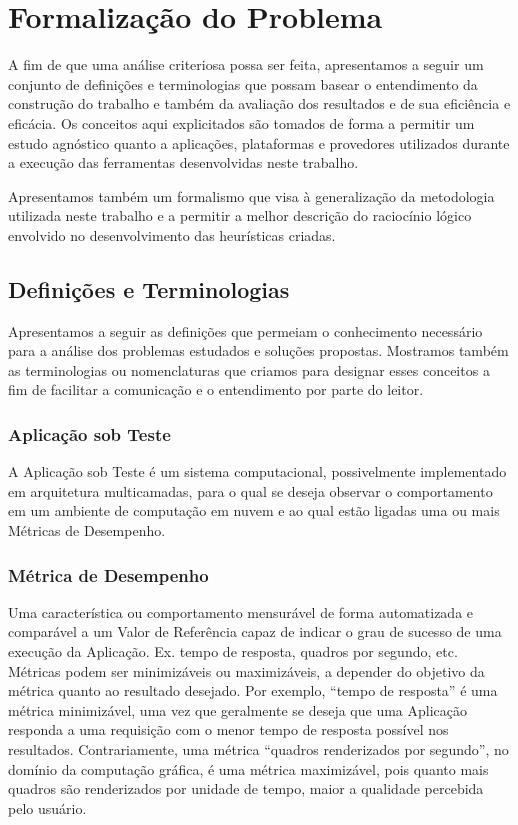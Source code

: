 \chapter[Formalização do Problema]{Formalização do Problema}
A fim de que uma análise criteriosa possa ser feita, apresentamos a seguir um 
conjunto de definições e terminologias que possam basear o entendimento da 
construção do trabalho e também da avaliação dos resultados e de sua eficiência 
e eficácia. Os conceitos aqui explicitados são tomados de forma a permitir um 
estudo agnóstico quanto a aplicações, plataformas e provedores utilizados 
durante a execução das ferramentas desenvolvidas neste trabalho.

Apresentamos também um formalismo que visa à generalização da metodologia 
utilizada neste trabalho e a permitir a melhor descrição do raciocínio lógico 
envolvido no desenvolvimento das heurísticas criadas.

\section{Definições e Terminologias}
Apresentamos a seguir as definições que permeiam o conhecimento necessário para 
a análise dos problemas estudados e soluções propostas. Mostramos também as 
terminologias ou nomenclaturas que criamos para designar esses conceitos a fim 
de facilitar a comunicação e o entendimento por parte do leitor.

\subsection{Aplicação sob Teste}
A Aplicação sob Teste é um sistema computacional, possivelmente implementado em 
arquitetura multicamadas, para o qual se deseja observar o comportamento em um 
ambiente de computação em nuvem e ao qual estão ligadas uma ou mais Métricas de 
Desempenho.

\subsection{Métrica de Desempenho}
Uma característica ou comportamento mensurável de forma automatizada e 
comparável a um Valor de Referência capaz de indicar o grau de sucesso de uma 
execução da Aplicação. Ex. tempo de resposta, quadros por segundo, etc. Métricas 
podem ser minimizáveis ou maximizáveis, a depender do objetivo da métrica quanto 
ao resultado desejado. Por exemplo, “tempo de resposta” é uma métrica 
minimizável, uma vez que geralmente se deseja que uma Aplicação responda a uma 
requisição com o menor tempo de resposta possível nos resultados. Contrariamente, 
uma métrica “quadros renderizados por segundo”, no domínio da computação gráfica, 
é uma métrica maximizável, pois quanto mais quadros são renderizados por unidade 
de tempo, maior a qualidade percebida pelo usuário.

